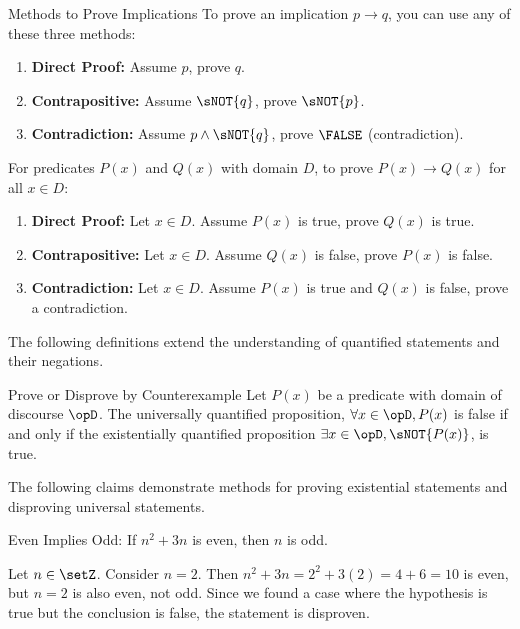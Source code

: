 \begin{define}{Methods to Prove Implications}
  \label{def:methods-prove-implications} 
  To prove an implication $p \to q$, you can use any of these three methods:
  \begin{enumerate}
    \item \textbf{Direct Proof:} Assume $p$, prove $q$.
    \item \textbf{Contrapositive:} Assume $\sNOT{q}$, prove $\sNOT{p}$.
    \item \textbf{Contradiction:} Assume $p \wedge \sNOT{q}$, prove $\FALSE$ (contradiction).
  \end{enumerate}
  
  For predicates $P(x)$ and $Q(x)$ with domain $D$, to prove $P(x) \to Q(x)$ for all $x \in D$:
  \begin{enumerate}
    \item \textbf{Direct Proof:} Let $x \in D$. Assume $P(x)$ is true, prove $Q(x)$ is true.
    \item \textbf{Contrapositive:} Let $x \in D$. Assume $Q(x)$ is false, prove $P(x)$ is false.
    \item \textbf{Contradiction:} Let $x \in D$. Assume $P(x)$ is true and $Q(x)$ is false, prove a contradiction.
  \end{enumerate}
\end{define}

The following definitions extend the understanding of quantified statements and their negations.

\begin{define}{Prove or Disprove by Counterexample}
  \label{def:counterexample} 
  Let $P(x)$ be a predicate with domain of discourse $\opD$. The 
  universally quantified proposition, $\forall x \in \opD, P(x)$
  is false if and only if the existentially quantified proposition 
  $\exists x \in \opD, \sNOT{P(x)}$, is true.
\end{define}

The following claims demonstrate methods for proving existential statements and disproving universal statements.

\begin{claim}{Even Implies Odd: If $n^2+3n$ is even, then $n$ is odd.}
  \label{claim:even-implies-odd} 
  \begin{subdisprove}
    Let $n\in \setZ$. 
    Consider $n=2$. Then $n^2+3n=2^2+3(2)=4+6=10$ is even, 
    but $n=2$ is also even, not odd. Since we found a case where the hypothesis 
    is true but the conclusion is false, the statement is disproven.
  \end{subdisprove}
\end{claim}

